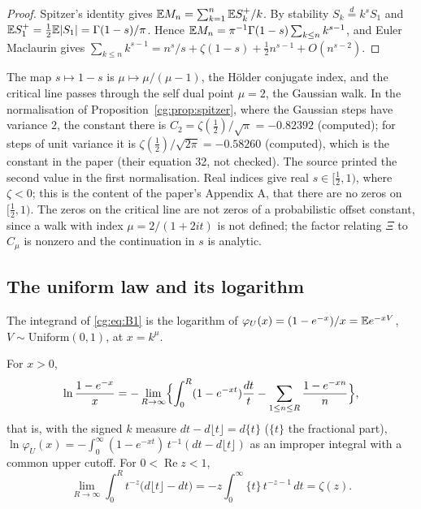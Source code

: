 \begin{proof}
Spitzer's identity \cite{Spitzer56} gives $\mathbb{E} M_n=\sum_{k=1}^n\mathbb{E} S_k^+/k$. By stability $S_k\overset{d}{=}k^{s}S_1$ and $\mathbb{E} S_1^+=\frac12\mathbb{E}|S_1|=\Gamma(1-s)/\pi$. Hence $\mathbb{E} M_n=\pi^{-1}\Gamma(1-s)\sum_{k\le n}k^{s-1}$, and Euler Maclaurin gives $\sum_{k\le n}k^{s-1}=n^s/s+\zeta(1-s)+\tfrac12n^{s-1}+O(n^{s-2})$.
\end{proof}

The map $s\mapsto1-s$ is $\mu\mapsto\mu/(\mu-1)$, the H\"older conjugate index, and the critical line passes through the self dual point $\mu=2$, the Gaussian walk. In the normalisation of Proposition~\ref{cg:prop:spitzer}, where the Gaussian steps have variance $2$, the constant there is $C_2=\zeta(\frac12)/\sqrt\pi=-0.82392$ (computed); for steps of unit variance it is $\zeta(\frac12)/\sqrt{2\pi}=-0.58260$ (computed), which is the constant in the paper (their equation 32, not checked). The source printed the second value in the first normalisation. Real indices give real $s\in[\frac12,1)$, where $\zeta<0$; this is the content of the paper's Appendix A, that there are no zeros on $[\frac12,1)$. The zeros on the critical line are not zeros of a probabilistic offset constant, since a walk with index $\mu=2/(1+2it)$ is not defined; the factor relating $\Xi$ to $C_\mu$ is nonzero and the continuation in $s$ is analytic.

\subsection{The uniform law and its logarithm}

The integrand of \eqref{cg:eq:B1} is the logarithm of $\varphi_U(x)=(1-e^{-x})/x=\mathbb{E} e^{-xV}$, $V\sim\mathrm{Uniform}(0,1)$, at $x=k^\mu$.

\begin{proposition}\label{cg:prop:signed}
For $x>0$,
\begin{equation}\label{cg:eq:signed}
\ln\frac{1-e^{-x}}{x}=-\lim_{R\to\infty}\Bigl\{\int_0^R(1-e^{-xt})\frac{dt}{t}-\sum_{1\le n\le R}\frac{1-e^{-xn}}{n}\Bigr\},
\end{equation}
that is, with the signed $k$ measure $dt-d\lfloor t\rfloor=d\{t\}$ ($\{t\}$ the fractional part), $\ln\varphi_U(x)=-\int_0^\infty(1-e^{-xt})\,t^{-1}(dt-d\lfloor t\rfloor)$ as an improper integral with a common upper cutoff. For $0<\operatorname{Re}z<1$,
\begin{equation}\label{cg:eq:zetamellin}
\lim_{R\to\infty}\int_0^Rt^{-z}\bigl(d\lfloor t\rfloor-dt\bigr)=-z\int_0^\infty\{t\}\,t^{-z-1}\,dt=\zeta(z).
\end{equation}
\end{proposition}

